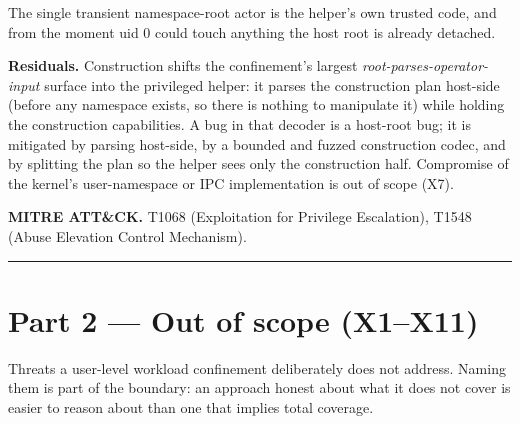 The single transient namespace-root actor is the helper's own trusted
code, and from the moment uid 0 could touch anything the host root is
already detached.

\textbf{Residuals.} Construction shifts the confinement's largest
\emph{root-parses-operator-input} surface into the privileged helper: it
parses the construction plan host-side (before any namespace exists, so
there is nothing to manipulate it) while holding the construction
capabilities. A bug in that decoder is a host-root bug; it is mitigated
by parsing host-side, by a bounded and fuzzed construction codec, and by
splitting the plan so the helper sees only the construction half.
Compromise of the kernel's user-namespace or IPC implementation is out
of scope (X7).

\textbf{MITRE ATT\&CK.} T1068 (Exploitation for Privilege Escalation),
T1548 (Abuse Elevation Control Mechanism).

\begin{center}\rule{0.5\linewidth}{0.5pt}\end{center}

\hypertarget{part-2-out-of-scope-x1x11}{%
\chapter{Part 2 --- Out of scope
(X1--X11)}\label{part-2-out-of-scope-x1x11}}

Threats a user-level workload confinement deliberately does not address.
Naming them is part of the boundary: an approach honest about what it
does not cover is easier to reason about than one that implies total
coverage.

